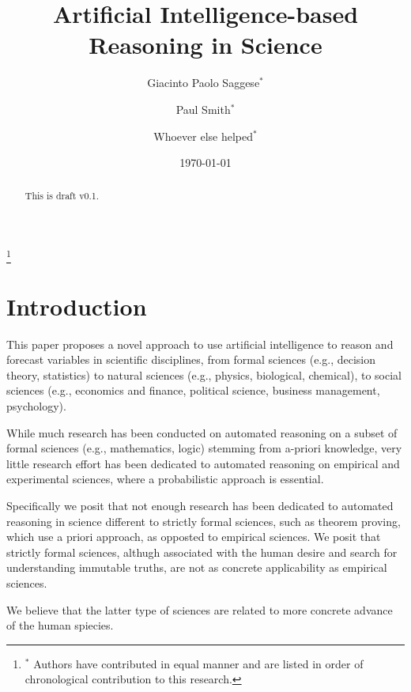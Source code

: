 \documentclass[11pt, reqno]{amsart}
\theoremstyle{definition}
\theoremstyle{remark}
\begin{document}
  \title{Artificial Intelligence-based Reasoning in Science}

  \author{Giacinto Paolo Saggese$^{*}$}
  \author{Paul Smith$^{*}$}
  \author{Whoever else helped$^{*}$}
  \thanks{$^{*}$ Authors have contributed in equal manner and are listed in
  order of chronological contribution to this research.}

  \date{\today}

  \begin{abstract}
    This is draft v0.1.
  \end{abstract}

  \maketitle

  \setcounter{tocdepth}{2}
  \tableofcontents

  \section{Introduction}

  This paper proposes a novel approach to use artificial intelligence to reason
  and forecast variables in scientific disciplines, from formal sciences (e.g.,
  decision theory, statistics) to natural sciences (e.g., physics, biological,
  chemical), to social sciences (e.g., economics and finance, political
  science, business management, psychology).

  While much research has been conducted on automated reasoning on a subset of
  formal sciences (e.g., mathematics, logic) stemming from a-priori knowledge,
  very little research effort has been dedicated to automated reasoning on
  empirical and experimental sciences, where a probabilistic approach is
  essential. 

  Specifically we posit that not enough research has been dedicated to
  automated reasoning in science different to strictly formal sciences, such as
  theorem proving, which use a priori approach, as opposted to empirical
  sciences. We posit that strictly formal sciences, althugh associated with
  the human desire and search for understanding immutable truths, are not
  as concrete applicability as empirical sciences.

  We believe that the latter type of sciences are related to more
  concrete advance of the human spiecies.
\end{document}

